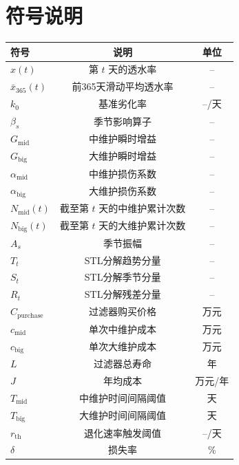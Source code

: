 \documentclass[withoutpreface,bwprint]{cumcmthesis}
\begin{document}
\section{符号说明}
\begin{table}[h!]
	\centering
	\renewcommand{\arraystretch}{1.5}
	\setlength{\tabcolsep}{30pt}
	\label{tab:符号说明}
	\begin{tabular}{lcc}
		\toprule[1.5pt]
		\textbf{符号} & \textbf{说明} & \textbf{单位} \\
		\midrule
		\rowcolor{LightBlue}
		$x(t)$ & 第 $t$ 天的透水率 & -- \\
		$\bar{x}_{365}(t)$ & 前365天滑动平均透水率 & -- \\
		\rowcolor{LightBlue}
		$k_0$ & 基准劣化率 & --/天 \\
		$\beta_s$ & 季节影响算子 & -- \\
		\rowcolor{LightBlue}
		$G_{\text{mid}}$ & 中维护瞬时增益 & -- \\
		$G_{\text{big}}$ & 大维护瞬时增益 & -- \\
		\rowcolor{LightBlue}
		$\alpha_{\text{mid}}$ & 中维护损伤系数 & -- \\
		$\alpha_{\text{big}}$ & 大维护损伤系数 & -- \\
		\rowcolor{LightBlue}
		$N_{\text{mid}}(t)$ & 截至第 $t$ 天的中维护累计次数 & -- \\
		$N_{\text{big}}(t)$ & 截至第 $t$ 天的大维护累计次数 & -- \\
		\rowcolor{LightBlue}
		$A_s$ & 季节振幅 & -- \\
		$T_t$ & STL分解趋势分量 & -- \\
		\rowcolor{LightBlue}
		$S_t$ & STL分解季节分量 & -- \\
		$R_t$ & STL分解残差分量 & -- \\
		\rowcolor{LightBlue}
		$C_{\text{purchase}}$ & 过滤器购买价格 & 万元 \\
		$c_{\text{mid}}$ & 单次中维护成本 & 万元 \\
		\rowcolor{LightBlue}
		$c_{\text{big}}$ & 单次大维护成本 & 万元 \\
		$L$ & 过滤器总寿命 & 年 \\
		\rowcolor{LightBlue}
		$J$ & 年均成本 & 万元/年 \\
		$T_{\text{mid}}$ & 中维护时间间隔阈值 & 天 \\
		\rowcolor{LightBlue}
		$T_{\text{big}}$ & 大维护时间间隔阈值 & 天 \\
		$r_{\text{th}}$ & 退化速率触发阈值 & --/天 \\
		\rowcolor{LightBlue}
		$\delta$ & 损失率 & \% \\
		\bottomrule[1.5pt]
	\end{tabular}
\end{table}
\end{document}
